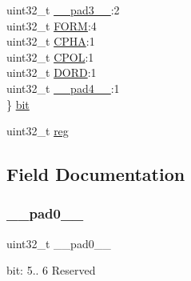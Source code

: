 \begin{DoxyCompactItemize}
\begin{tabbing}
\>uint32\_t \mbox{\hyperlink{union_s_e_r_c_o_m___s_p_i___c_t_r_l_a___type_a4854608c0e776f0704a4d9a4b98ea57d}{\_\_pad3\_\_}}:2\\
\>uint32\_t \mbox{\hyperlink{union_s_e_r_c_o_m___s_p_i___c_t_r_l_a___type_ae3792567859cd4a01a4d503b1bb3b9c9}{FORM}}:4\\
\>uint32\_t \mbox{\hyperlink{union_s_e_r_c_o_m___s_p_i___c_t_r_l_a___type_aaf6c43320ad2ac7b0bc0dac11374232e}{CPHA}}:1\\
\>uint32\_t \mbox{\hyperlink{union_s_e_r_c_o_m___s_p_i___c_t_r_l_a___type_a816478ce3c6267bc9f66be53517dec36}{CPOL}}:1\\
\>uint32\_t \mbox{\hyperlink{union_s_e_r_c_o_m___s_p_i___c_t_r_l_a___type_abc1e8d61860eb51bb34876e85258b136}{DORD}}:1\\
\>uint32\_t \mbox{\hyperlink{union_s_e_r_c_o_m___s_p_i___c_t_r_l_a___type_a7b2edc85d90e34c4435951e1e5c59517}{\_\_pad4\_\_}}:1\\
\} \mbox{\hyperlink{union_s_e_r_c_o_m___s_p_i___c_t_r_l_a___type_a018c64bbbfcdd2afe8575c945b7dcd84}{bit}}\\

\end{tabbing}\item 
uint32\+\_\+t \mbox{\hyperlink{union_s_e_r_c_o_m___s_p_i___c_t_r_l_a___type_a6b91636401516a477989a336376d7b40}{reg}}
\end{DoxyCompactItemize}


\subsection{Field Documentation}
\mbox{\label{union_s_e_r_c_o_m___s_p_i___c_t_r_l_a___type_a3e57c2ef1c3ffb36722f000cc1156824}} 
\subsubsection{\texorpdfstring{\_\_pad0\_\_}{\_\_pad0\_\_}}
{\footnotesize\ttfamily uint32\+\_\+t \+\_\+\+\_\+pad0\+\_\+\+\_\+}

bit\+: 5.. 6 Reserved \mbox{\label{union_s_e_r_c_o_m___s_p_i___c_t_r_l_a___type_a6712ba6dd1d5b43d2d56ff8ac4e275a7}} 
